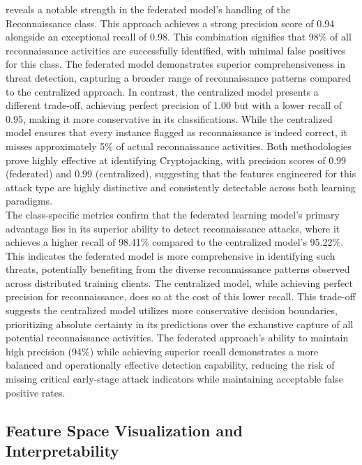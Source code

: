  reveals a notable strength in the federated model's handling of the Reconnaissance class. This approach achieves a strong precision score of 0.94 alongside an exceptional recall of 0.98. This combination signifies that 98\% of all reconnaissance activities are successfully identified, with minimal false positives for this class. The federated model demonstrates superior comprehensiveness in threat detection, capturing a broader range of reconnaissance patterns compared to the centralized approach. In contrast, the centralized model presents a different trade-off, achieving perfect precision of 1.00 but with a lower recall of 0.95, making it more conservative in its classifications. While the centralized model ensures that every instance flagged as reconnaissance is indeed correct, it misses approximately 5\% of actual reconnaissance activities. Both methodologies prove highly effective at identifying Cryptojacking, with precision scores of 0.99 (federated) and 0.99 (centralized), suggesting that the features engineered for this attack type are highly distinctive and consistently detectable across both learning paradigms. \\

The class-specific metrics confirm that the federated learning model's primary advantage lies in its superior ability to detect reconnaissance attacks, where it achieves a higher recall of 98.41\% compared to the centralized model's 95.22\%. This indicates the federated model is more comprehensive in identifying such threats, potentially benefiting from the diverse reconnaissance patterns observed across distributed training clients. The centralized model, while achieving perfect precision for reconnaissance, does so at the cost of this lower recall. This trade-off suggests the centralized model utilizes more conservative decision boundaries, prioritizing absolute certainty in its predictions over the exhaustive capture of all potential reconnaissance activities. The federated approach's ability to maintain high precision (94\%) while achieving superior recall demonstrates a more balanced and operationally effective detection capability, reducing the risk of missing critical early-stage attack indicators while maintaining acceptable false positive rates.


\newpage
\subsection{Feature Space Visualization and Interpretability}

